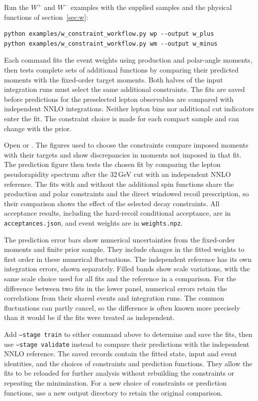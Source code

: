 Run the $W^{+}$ and $W^{-}$ examples with the supplied samples and the physical functions of section~\ref{sec:w}:
\begin{verbatim}
python examples/w_constraint_workflow.py wp --output w_plus
python examples/w_constraint_workflow.py wm --output w_minus
\end{verbatim}
Each command fits the event weights using production and polar-angle moments, then tests complete sets of additional functions by comparing their predicted moments with the fixed-order target moments. Both halves of the input integration runs must select the same additional constraints. The fits are saved before predictions for the preselected lepton observables are compared with independent NNLO integrations. Neither lepton bins nor additional cut indicators enter the fit. The constraint choice is made for each compact sample and can change with the prior.

Open  or . The figures used to choose the constraints compare imposed moments with their targets and show discrepancies in moments not imposed in that fit. The prediction figure then tests the chosen fit by comparing the lepton pseudorapidity spectrum after the $32\,$GeV cut with an independent NNLO reference. The fits with and without the additional spin functions share the production and polar constraints and the direct windowed recoil prescription, so their comparison shows the effect of the selected decay constraints. All acceptance results, including the hard-recoil conditional acceptance, are in \texttt{acceptances.json}, and event weights are in \texttt{weights.npz}.

The prediction error bars show numerical uncertainties from the fixed-order moments and finite prior sample. They include changes in the fitted weights to first order in these numerical fluctuations. The independent reference has its own integration errors, shown separately. Filled bands show scale variations, with the same scale choice used for all fits and the reference in a comparison. For the difference between two fits in the lower panel, numerical errors retain the correlations from their shared events and integration runs. The common fluctuations can partly cancel, so the difference is often known more precisely than it would be if the fits were treated as independent.

Add \texttt{--stage train} to either command above to determine and save the fits, then use \texttt{--stage validate} instead to compare their predictions with the independent NNLO reference. The saved records contain the fitted state, input and event identities, and the choices of constraints and prediction functions. They allow the fits to be reloaded for further analysis without rebuilding the constraints or repeating the minimization. For a new choice of constraints or prediction functions, use a new output directory to retain the original comparison.

